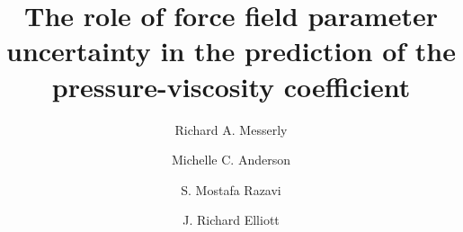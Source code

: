 \documentclass[preprint,review,12pt]{elsarticle}
\begin{document}
	
	\begin{frontmatter}
		
		
		
		\title{The role of force field parameter uncertainty in the prediction of the pressure-viscosity coefficient}
		
		
		\author{Richard A. Messerly}
		\address{Thermodynamics Research Center, National Institute of Standards and Technology, Boulder, Colorado, 80305}
		
		\author{Michelle C. Anderson}
		\address{Thermodynamics Research Center, National Institute of Standards and Technology, Boulder, Colorado, 80305}
		
		\author{S. Mostafa Razavi}
		\address{Department of Chemical and Biomolecular Engineering, The University of Akron, Akron, Ohio, 44325-3906}
		
		\author{J. Richard Elliott}
		\address{Department of Chemical and Biomolecular Engineering, The University of Akron, Akron, Ohio, 44325-3906}
		

\end{frontmatter}
\end{document}
